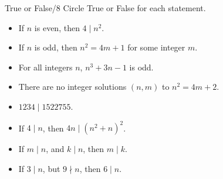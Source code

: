 \documentclass[12pt,letterpaper]{article}
\begin{document}
\begin{problem}{True or False\hfill/8}
  Circle True or False for each statement.

  \begin{itemize}
    \item If \(n\) is even, then \(4 \mid n^2\). \hfill \TFTrue
    \item If \(n\) is odd, then \(n^2 = 4m + 1\) for some integer \(m\).
    \hfill \TFTrue
    \item For all integers \(n\), \(n^3 + 3n - 1\) is odd. \hfill \TFTrue
    \item There are no integer solutions \((n, m)\) to \(n^2 = 4m + 2\).
    \hfill \TFTrue
    \item \(1234 \mid 1522755\). \hfill \TFFalse
    \item If \(4 \mid n\), then \(4n \mid (n^2+n)^2\). \hfill \TFTrue
    \item If \(m \mid n\), and \(k \mid n\), then \(m \mid k\). \hfill \TFFalse
    \item If \(3 \mid n\), but \(9 \nmid n\), then \(6 \mid n\). \hfill
    \TFFalse
  \end{itemize}
\end{problem}
\end{document}
